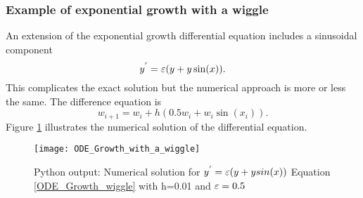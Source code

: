 \subsubsection{Example of exponential growth with a wiggle}

\begin{example}
An extension of the exponential growth differential equation includes a sinusoidal component 
\begin{equation}\label{ODE_Growth_wiggle} y^{'}=\varepsilon (y+y \sin(x)). \end{equation}
This complicates the exact solution but the numerical approach is more or less the same.
The difference equation is 
\[w_{i+1}=w_i+h(0.5w_i+w_i\sin(x_i)). \]
Figure \ref{GROWTH ODE WIGGLE} illustrates the numerical solution of the differential equation.

\begin{figure}[H]
\centering
\texttt{[image: ODE\_Growth\_with\_a\_wiggle]}
\caption{Python output: Numerical solution for $y^{'}=\varepsilon (y+y sin(x))$ Equation \ref{ODE_Growth_wiggle} with h=0.01 and $\varepsilon=0.5$}
\label{GROWTH ODE WIGGLE}
\end{figure}

\end{example}

